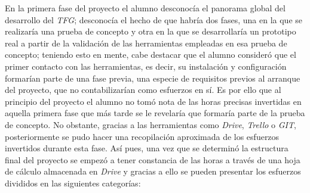 En la primera fase del proyecto el alumno desconocía el panorama global del desarrollo del \textit{TFG}; desconocía el hecho de que habría dos fases, una en la que se realizaría una prueba de concepto y otra en la que se desarrollaría un prototipo real a partir de la validación de las herramientas empleadas en esa prueba de concepto; teniendo esto en mente, cabe destacar que el alumno consideró que el primer contacto con las herramientas, es decir, su instalación y configuración formarían parte de una fase previa, una especie de requisitos previos al arranque del proyecto, que no contabilizarían como esfuerzos en sí. Es por ello que al principio del proyecto el alumno no tomó nota de las horas precisas invertidas en aquella primera fase que más tarde se le revelaría que formaría parte de la prueba de concepto. No obstante, gracias a las herramientas como \textit{Drive}, \textit{Trello} o \textit{GIT}, posteriormente se pudo hacer una recopilación aproximada de los esfuerzos invertidos durante esta fase. Así pues, una vez que se determinó la estructura final del proyecto se empezó a tener constancia de las horas a través de una hoja de cálculo almacenada en \textit{Drive} y gracias a ello se pueden presentar los esfuerzos divididos en las siguientes categorías: 
